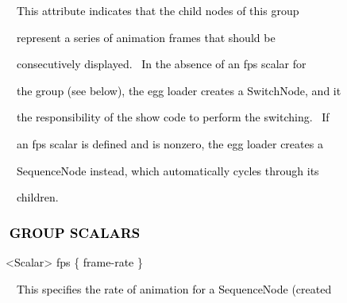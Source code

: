 \documentclass[a4paper]{article}
\newcommand\textstyleOOoComputerKeyWord[1]{\textrm{\textcolor[rgb]{0.0,0.0,0.5019608}{#1}}}
\newcommand\textstyleOOoAssemblerSpecialChar[1]{\textrm{\textcolor[rgb]{0.0,0.5019608,0.0}{#1}}}
\newcommand\textstyleOOoAssemblerIdent[1]{\textrm{\textcolor{black}{#1}}}
\begin{document}
\bigskip

{\color{black}
\textstyleOOoComputerKeyWord{\textcolor{black}{\ \ \ \ This attribute indicates that the child nodes of this group}}}

{\color{black}
\textstyleOOoComputerKeyWord{\textcolor{black}{\ \ \ \ represent a series of animation frames that should be}}}

{\color{black}
\textstyleOOoComputerKeyWord{\textcolor{black}{\ \ \ \ consecutively displayed. \ In the absence of an
{\textquotedbl}fps{\textquotedbl} scalar for}}}

{\color{black}
\textstyleOOoComputerKeyWord{\textcolor{black}{\ \ \ \ the group (see below), the egg loader creates a SwitchNode, and
it}}}

{\color{black}
\textstyleOOoComputerKeyWord{\textcolor{black}{\ \ \ \ the responsibility of the show code to perform the switching.
\ If}}}

{\color{black}
\textstyleOOoComputerKeyWord{\textcolor{black}{\ \ \ \ an fps scalar is defined and is nonzero, the egg loader creates
a}}}

{\color{black}
\textstyleOOoComputerKeyWord{\textcolor{black}{\ \ \ \ SequenceNode instead, which automatically cycles through its}}}

{\color{black}
\textstyleOOoComputerKeyWord{\textcolor{black}{\ \ \ \ children.}}}


\bigskip


\bigskip

\subsubsection[\ \ GROUP SCALARS]{\textstyleOOoComputerKeyWord{\textcolor{black}{\ \ GROUP SCALARS}}}
\hypertarget{RefHeading7688869075401}{}
\bigskip

{\color{black}
\textstyleOOoComputerKeyWord{\textcolor{black}{\ \ }}\textstyleOOoAssemblerSpecialChar{{\textless}}\textstyleOOoAssemblerIdent{Scalar}\textstyleOOoAssemblerSpecialChar{{\textgreater}}\textstyleOOoComputerKeyWord{\textcolor{black}{
}}\textstyleOOoAssemblerIdent{fps}\textstyleOOoComputerKeyWord{\textcolor{black}{
}}\textstyleOOoAssemblerSpecialChar{\{}\textstyleOOoComputerKeyWord{\textcolor{black}{
}}\textstyleOOoAssemblerIdent{frame}\textstyleOOoAssemblerSpecialChar{{}-}\textstyleOOoAssemblerIdent{rate}\textstyleOOoComputerKeyWord{\textcolor{black}{
}}\textstyleOOoAssemblerSpecialChar{\}}}


\bigskip

{\color{black}
\textstyleOOoComputerKeyWord{\textcolor{black}{\ \ \ \ This specifies the rate of animation for a SequenceNode
(created}}}
\end{document}
